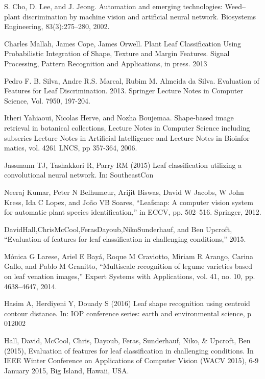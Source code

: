 \documentclass[journal, 10pt]{IEEEtran}
\begin{document}
\begin{thebibliography}{1}

    S. Cho, D. Lee, and J. Jeong. Automation and emerging technologies: Weed–plant discrimination by machine vision and artificial neural network. Biosystems Engineering, 83(3):275–280, 2002.

    Charles Mallah, James Cope, James Orwell. Plant Leaf Classification Using Probabilistic Integration of Shape, Texture and Margin Features. Signal Processing, Pattern Recognition and Applications, in press. 2013

    Pedro F. B. Silva, Andre R.S. Marcal, Rubim M. Almeida da Silva. Evaluation of Features for Leaf Discrimination. 2013. Springer Lecture Notes in Computer Science, Vol. 7950, 197-204.

    Itheri Yahiaoui, Nicolas Herve, and Nozha Boujemaa. Shape-based image retrieval in botanical collections, Lecture Notes in Computer Science including subseries Lecture Notes in Artificial Intelligence and Lecture Notes in Bioinfor matics, vol. 4261 LNCS, pp 357-364, 2006.

    Jassmann TJ, Tashakkori R, Parry RM (2015) Leaf classification utilizing a convolutional neural network. In: SoutheastCon

    Neeraj Kumar, Peter N Belhumeur, Arijit Biswas, David W Jacobs, W John Kress, Ida C Lopez, and João VB Soares, “Leafsnap: A computer vision system for automatic plant species identification,” in ECCV, pp. 502–516. Springer, 2012.

    DavidHall,ChrisMcCool,FerasDayoub,NikoSunderhauf, and Ben Upcroft, “Evaluation of features for leaf classification in challenging conditions,” 2015.

    Mónica G Larese, Ariel E Bayá, Roque M Craviotto, Miriam R Arango, Carina Gallo, and Pablo M Granitto, “Multiscale recognition of legume varieties based on leaf venation images,” Expert Systems with Applications, vol. 41, no. 10, pp. 4638–4647, 2014.

    Hasim A, Herdiyeni Y, Douady S (2016) Leaf shape recognition using centroid contour distance. In: IOP conference series: earth and environmental science, p 012002

    Hall, David, McCool, Chris, Dayoub, Feras, Sunderhauf, Niko, \& Upcroft, Ben (2015), Evaluation of features for leaf classification in challenging conditions. In IEEE Winter Conference on Applications of Computer Vision (WACV 2015), 6-9 January 2015, Big Island, Hawaii, USA.



\end{thebibliography}
\end{document}
